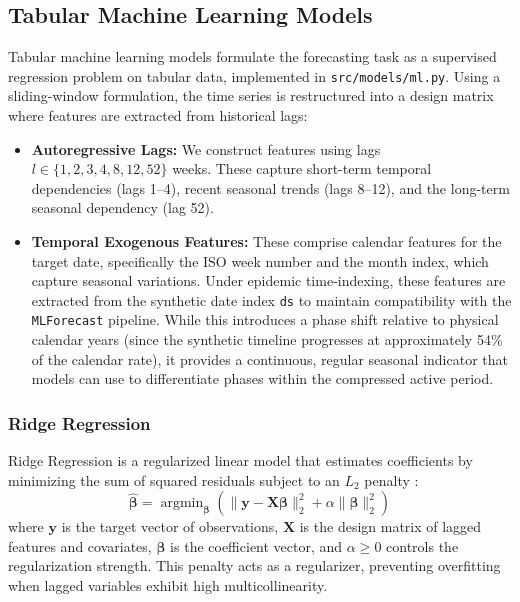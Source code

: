 \subsection{Tabular Machine Learning Models}
Tabular machine learning models formulate the forecasting task as a supervised regression problem on tabular data, implemented in \texttt{src/models/ml.py}. Using a sliding-window formulation, the time series is restructured into a design matrix where features are extracted from historical lags:
\begin{itemize}
    \item \textbf{Autoregressive Lags:} We construct features using lags $l \in \{1, 2, 3, 4, 8, 12, 52\}$ weeks. These capture short-term temporal dependencies (lags 1--4), recent seasonal trends (lags 8--12), and the long-term seasonal dependency (lag 52).
    \item \textbf{Temporal Exogenous Features:} These comprise calendar features for the target date, specifically the ISO week number and the month index, which capture seasonal variations. Under epidemic time-indexing, these features are extracted from the synthetic date index \texttt{ds} to maintain compatibility with the \texttt{MLForecast} pipeline. While this introduces a phase shift relative to physical calendar years (since the synthetic timeline progresses at approximately 54\% of the calendar rate), it provides a continuous, regular seasonal indicator that models can use to differentiate phases within the compressed active period.
\end{itemize}

\subsubsection{Ridge Regression}
Ridge Regression is a regularized linear model that estimates coefficients by minimizing the sum of squared residuals subject to an $L_2$ penalty \cite{hoerl1970ridge}:
\begin{equation}
\hat{\boldsymbol{\beta}} = \operatorname{argmin}_{\boldsymbol{\beta}} \left( \|\mathbf{y} - \mathbf{X}\boldsymbol{\beta}\|_2^2 + \alpha \|\boldsymbol{\beta}\|_2^2 \right)
\end{equation}
where $\mathbf{y}$ is the target vector of observations, $\mathbf{X}$ is the design matrix of lagged features and covariates, $\boldsymbol{\beta}$ is the coefficient vector, and $\alpha \ge 0$ controls the regularization strength. This penalty acts as a regularizer, preventing overfitting when lagged variables exhibit high multicollinearity.

